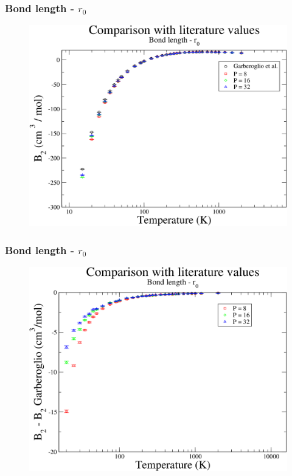 \documentclass[xcolor=svgnames]{beamer}
\begin{document}
	\begin{frame}
	\frametitle{Bond length - $r_0$}
	\begin{figure}
	\centering
	\includegraphics[scale=0.18,keepaspectratio]{8sfGResults.png}
	\end{figure}
	
	\end{frame}

	\begin{frame}
	\frametitle{Bond length - $r_0$}
	\begin{figure}
	\centering
	\includegraphics[scale=0.18,keepaspectratio]{8sfGResultsDiff.png}
	\end{figure}
	
	\end{frame}
\end{document}
